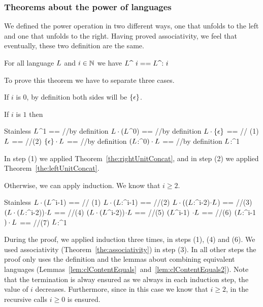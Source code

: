 \subsubsection{Theorems about the power of languages}

We defined the power operation in two different ways, one that unfolds to the left and one that unfolds to the right. Having proved associativity, we feel that eventually, these two definition are the same.


\begin{theorem}
	\label{the:couldHaveDefinedOtherWay}
	For all language $L$ and $i \in \mathbb{N}$ we have $L \text{\textasciicircum~} i == L \text{\textasciicircum:~} i$
\end{theorem}

To prove this theorem we have to separate three cases.

If $i$ is $0$, by definition both sides will be $\{\epsilon\}$.

If $i$ is $1$ then 
\begin{ShortCode}{Stainless}
 $L$^1 == //by definition
 $L \cdot (L$^0) == //by definition
 $L \cdot \{\epsilon\}$ == // (1)
 $L$ == //(2)
 $\{\epsilon\} \cdot L$ == //by definition
 $(L$:^0$) \cdot L$ == //by definition
 $L$:^1
\end{ShortCode}

In step (1) we applied Theorem~\ref{the:rightUnitConcat}, and in step (2) we applied Theorem~\ref{the:leftUnitConcat}.

Otherwise, we can apply induction. We know that $i \ge 2$.

\begin{ShortCode}{Stainless}
 $L \cdot (L$^i-1) == // (1) 
 $L \cdot (L$:^i-1) == //(2)
 $L \cdot ((L$:^i-2)$\cdot L$) == //(3)
 $(L \cdot (L$:^i-2))$\cdot L$ == //(4)
 $(L \cdot (L$^i-2))$\cdot L$ == //(5)
 $(L$^i-1) $\cdot L$ == //(6)
 $(L$:^i-1$) \cdot L$ ==  //(7)
 $L$:^1
\end{ShortCode}

During the proof, we applied induction three times, in steps (1), (4) and (6). We used associativity (Theorem~\ref{the:associativity}) in step (3). In all other steps the proof only uses the definition and the lemmas about combining equivalent languages (Lemmas~\ref{lem:clContentEquals}~and~\ref{lem:clContentEquals2}). Note that the termination is alway ensured as we always in each induction step, the value of $i$ decreases. Furthermore, since in this case we know that $i \ge 2$, in the recursive calls $i \ge 0$ is ensured.

